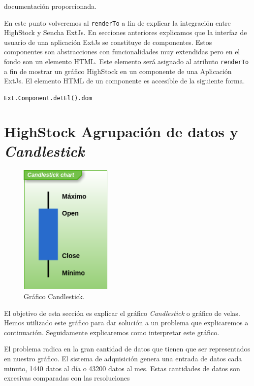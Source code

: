 	documentación proporcionada\cite{HighStockDoc}.
	\par
	En este punto volveremos al \texttt{renderTo} a fin de explicar la integración entre HighStock y Sencha ExtJs. En secciones anteriores
	explicamos que la interfaz de usuario de una aplicación ExtJs se constituye de componentes. Estos componentes son abstracciones con
	funcionalidades muy extendidas pero en el fondo son un elemento HTML. Este elemento será asignado al atributo \texttt{renderTo} a fin de
	mostrar un gráfico HighStock en un componente de una Aplicación ExtJs. El elemento HTML de un componente es accesible de la siguiente forma.
    		\begin{center} \texttt{Ext.Component.detEl().dom}  \end{center}

\section{HighStock Agrupación de datos y \emph{Candlestick}} 
	\begin{figure}
		\centering
	        \includegraphics[keepaspectratio, width=0.40\textwidth]{./img/candlestick.png}
		\caption{Gráfico Candlestick.}
		\label{fig:candlestick}
	\end{figure}
	El objetivo de esta sección es explicar el gráfico \emph{Candlestick} o gráfico de velas. Hemos utilizado este gráfico para dar solución a un
	problema que explicaremos a continuación. Seguidamente explicaremos como interpretar este gráfico.
	\par
	El problema radica en la gran cantidad de datos que tienen que ser representados en nuestro gráfico. El sistema de adquisición genera una
	entrada de datos cada minuto, 1440 datos al día o 43200 datos al mes. Estas cantidades de datos son excesivas comparadas con las resoluciones
